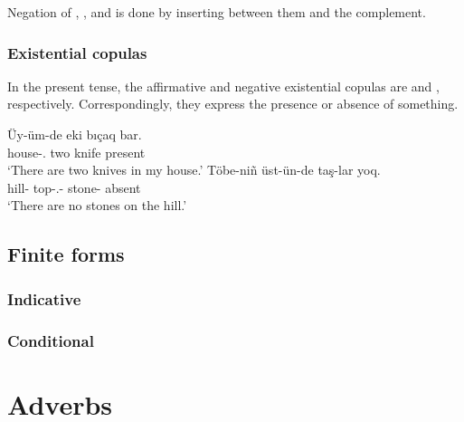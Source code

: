 Negation of , , and  is done by inserting  between them and the complement.

\subsection{Existential copulas}

In the present tense, the affirmative and negative existential copulas are  and , respectively.
Correspondingly, they express the presence or absence of something.

\begin{lingexample}
	\ex \gll Üy-üm-de eki bıçaq bar. \\
		house-\Poss{}.\Fsg{} two knife present \\
		\glt `There are two knives in my house.'
	\ex \gll Töbe-niñ üst-ün-de taş-lar yoq. \\
		hill-\Gen{} top-\Poss{}.\Third{}-\Loc{} stone-\Pl{} absent \\
		\glt `There are no stones on the hill.'
\end{lingexample}

\section{Finite forms}

\subsection{Indicative}

\subsection{Conditional}

\chapter{Adverbs}
